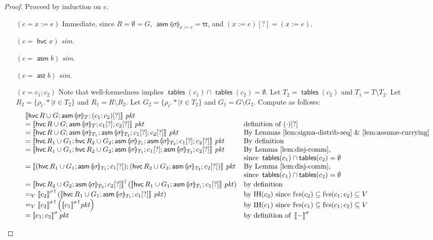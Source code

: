 \documentclass{article}
\newcommand{\pkt}{\mathit{pkt}}
\newcommand{\denote}[1]{\left\llbracket#1\right\rrbracket}
\newcommand{\TRUE}{\mathsf{tt}}
\newcommand{\assert}{\mathop{\mathsf{ast}}}
\newcommand{\assume}{\mathop{\mathsf{asm}}}
\newcommand{\havoc}[1]{\mathop{\mathsf{hvc}}#1}
\newcommand{\state}[1]{\llparenthesis#1\rrparenthesis}
\newcommand{\instr}{[?]}
\newcommand{\fvs}{\textrm{fvs}}
\newcommand{\tables}{\mathop{\mathsf{tables}}}
\theoremstyle{plain}
\theoremstyle{definition}
\theoremstyle{remark}
\begin{document}
\begin{proof}
  Proceed by induction on $c$.
  \begin{enumerate}[align=left]
  \item[$(c = x:=e)$] Immediate, since $R = \emptyset = G$, $\assume{\state\sigma}_{x:=e} = \TRUE$, and $(x:=e)\instr = (x:=e)$.
  \item[$(c = \havoc x)$] \textit{sim}.
  \item[$(c = \assume b)$] \textit{sim}.
  \item[$(c = \assert b)$] \textit{sim}.
  \item[$(c = c_1;c_2)$] Note that well-formedness implies $\tables(c_1) \cap
    \tables(c_2) = \emptyset$. Let $T_2 = \tables(c_2)$ and $T_1 = T \setminus
    T_2$. Let $R_2 = \{\rho_t.* \mid t \in T_2\}$ and $R_1 = R \setminus R_2$.
    Let $G_2 = \{\rho_t.* \mid t \in T_2\}$ and $G_1 = G \setminus G_2$. Compute
    as follows:
    \[\begin{array}{ll}
    \denote{\havoc {R \cup G}; \assume{\state\sigma_{T}};(c_1;c_2)\instr}\,\pkt
    & \\
    = \denote{\havoc{R\cup G}; \assume{\state\sigma_{T}}; c_1\instr;c_2\instr}\,\pkt
    & \text{definition of }(\cdot)\instr \\
    = \denote{\havoc{R\cup G}; \assume{\state\sigma_{T_1}};\assume{\state\sigma_{T_2}};c_1\instr;c_2\instr}\,\pkt
    & \text{By Lemmas~\ref{lem:sigma-distrib-seq} \&~\ref{lem:assume-currying}} \\
    = \denote{\havoc{R_1 \cup G_1}; \havoc{R_2 \cup G_2}; \assume{\state\sigma_{T_1}};\assume{\state\sigma_{T_2}};c_1\instr;c_2\instr}\,\pkt
    & \text{By definition } \\
    = \denote{\havoc{R_1\cup G_1}; \havoc{R_2 \cup G_2}; \assume{\state\sigma_{T_1}};c_1\instr;\assume{\state\sigma_{T_2}};c_2\instr}\,\pkt
    & \text{By Lemma~\ref{lem:disj-comm}}, \\ &\text{since } \tables(c_1) \cap \tables(c_2) = \emptyset \\
    = \denote{(\havoc{R_1 \cup G_1}; \assume{\state\sigma_{T_1}};c_1\instr);
      (\havoc{R_2 \cup G_2};\assume{\state\sigma_{T_2}};c_2\instr)}\,\pkt
    & \text{By Lemma~\ref{lem:disj-comm}}, \\ & \text{since } \tables(c_1) \cap \tables(c_2) = \emptyset\\
    = \denote{\havoc{R_2 \cup G_2};\assume{\state\sigma_{T_2}};c_2\instr}^\dagger
    \left(\denote{\havoc{R_1 \cup G_1}; \assume{\state\sigma_{T_1}};c_1\instr}\,\pkt\right)
    & \text{by definition} \\
    =_V {\denote{c_2}^\sigma}^\dagger \left(\denote{\havoc{R_1 \cup G_1}; \assume{\state\sigma_{T_1}};c_1\instr}\,\pkt\right)
    & \text{by IH}(c_2) \text{ since } \fvs(c_2) \subseteq \fvs(c_1;c_2) \subseteq V \\
    =_V {\denote{c_2}^\sigma}^\dagger \left({\denote{c_1}^\sigma}^\dagger\pkt\right)
    & \text{by IH}(c_1) \text{ since } \fvs(c_1) \subseteq \fvs(c_1;c_2) \subseteq V \\
    = \denote{c_1;c_2}^\sigma\pkt
    & \text{by definition of }\denote{-}^\sigma\\
    \end{array}\]


\end{enumerate}
\end{proof}
\end{document}
